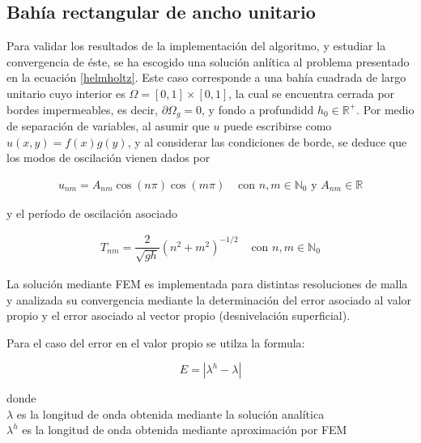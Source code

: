  \subsection{Bah\'ia rectangular de ancho unitario}
  Para validar los resultados de la implementaci\'on del algoritmo, y estudiar la convergencia de \'este, se ha escogido una soluci\'on anl\'itica al problema presentado en la ecuaci\'on \eqref{helmholtz}. Este caso corresponde a una bah\'ia cuadrada de largo unitario cuyo interior es $\Omega = [0,1]\times[0,1]$, la cual se encuentra cerrada por bordes impermeables, es decir, $\partial \Omega_g=0$, y fondo a profundidd $h_0\in\mathbb{R^+}$. Por medio de separaci\'on de variables, al asumir que $u$ puede escribirse como $u(x,y)=f(x)g(y)$, y al considerar las condiciones de borde, se deduce que los modos de oscilaci\'on vienen dados por 
  
  \begin{equation}
    \begin{array}{cc}
    u_{nm}=A_{nm}\cos(n\pi)\cos(m\pi) & \text{ con } n,m \in \mathbb{N}_0 \text{ y } A_{nm}\in\mathbb{R}
    \end{array}
    \label{eq:bahia_cerrada_modo}
  \end{equation}

  y el per\'iodo de oscilaci\'on asociado
  
  \begin{equation}
    \begin{array}{cc}
    T_{nm}=\dfrac{2}{\sqrt{gh}}\left( n^2+m^2\right)^{-1/2} & \text{ con } n,m \in \mathbb{N}_0
    \end{array}
    \label{eq:bahia_cerrada_periodo}
  \end{equation}

La soluci\'on mediante FEM es implementada para distintas resoluciones de malla y analizada su convergencia mediante la determinaci\'on del error asociado al valor propio y el error asociado al vector propio (desnivelaci\'on superficial).

Para el caso del error en el valor propio se utilza la formula:

$$E = |\lambda^h - \lambda|$$

donde \\

$\lambda$ es la longitud de onda obtenida mediante la soluci\'on anal\'itica\\

$\lambda^h$ es la longitud de onda obtenida mediante aproximaci\'on por FEM\\


